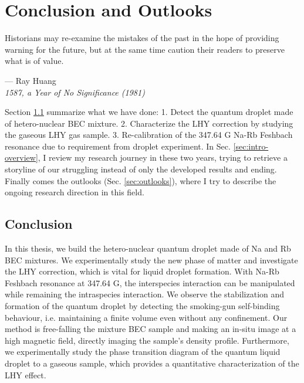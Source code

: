 \chapter{Conclusion and Outlooks}
\label{chap:conclusion}

\setlength{\unitlength}{1pt}
\setlength{\epigraphwidth}{11cm}
\epigraph{Historians may re-examine the mistakes of the past in the hope of providing warning for the future, but at the same time caution their readers to preserve what is of value. \cite{HuangRay19811ayo}}{--- Ray Huang\\ \textit{1587, a Year of No Significance (1981)}}

Section \ref{conclu} summarize what we have done: 1. Detect the quantum droplet made of hetero-nuclear BEC mixture. 2. Characterize the LHY correction by studying the gaseous LHY gas sample. 3. Re-calibration of the 347.64 G Na-Rb Feshbach resonance due to requirement from droplet experiment. In Sec. \ref{sec:intro-overview}, I review my research journey in these two years, trying to retrieve a storyline of our struggling instead of only the developed results and ending. Finally comes the outlooks (Sec. \ref{sec:outlooks}), where I try to describe the ongoing research direction in this field.

\section{Conclusion}
\label{conclu}

In this thesis, we build the hetero-nuclear quantum droplet made of Na and Rb BEC mixtures. We experimentally study the new phase of matter and investigate the LHY correction, which is vital for liquid droplet formation. With Na-Rb Feshbach resonance at 347.64 G, the interspecies interaction can be manipulated while remaining the intraspecies interaction. We observe the stabilization and formation of the quantum droplet by detecting the smoking-gun self-binding behaviour, i.e. maintaining a finite volume even without any confinement. Our method is free-falling the mixture BEC sample and making an in-situ image at a high magnetic field, directly imaging the sample's density profile. Furthermore, we experimentally study the phase transition diagram of the quantum liquid droplet to a gaseous sample, which provides a quantitative characterization of the LHY effect. 

